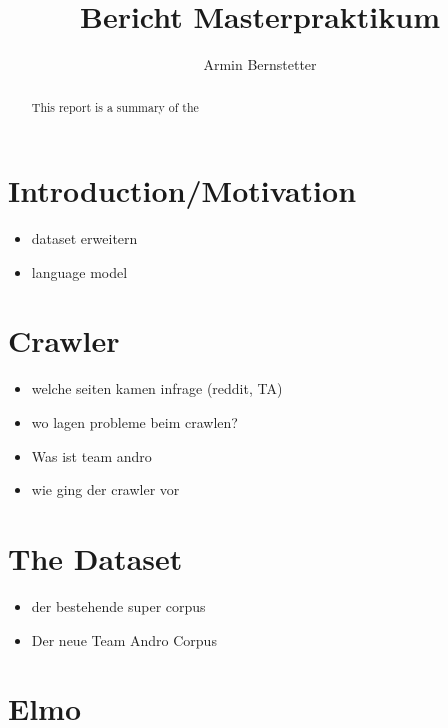 \documentclass[sigconf,natbib=false]{acmart}
\begin{document}

\title{Bericht Masterpraktikum}

\author{Armin Bernstetter}


\begin{abstract}
This report is a summary of the 
\end{abstract}



\maketitle

\section{Introduction/Motivation}

\begin{itemize}
	\item dataset erweitern
	\item language model
\end{itemize}


\section{Crawler}

\begin{itemize}
	\item welche seiten kamen infrage (reddit, TA)
	\item wo lagen probleme beim crawlen?
	\item Was ist team andro
	\item wie ging der crawler vor
\end{itemize}

\section{The Dataset}

\begin{itemize}
	\item der bestehende super corpus
	\item Der neue Team Andro Corpus
\end{itemize}

\section{Elmo}
\end{document}
